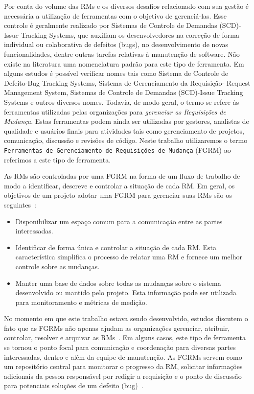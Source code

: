 Por conta do volume das RMs e os diversos desafios relacionado com sua gestão é
necessária a utilização de ferramentas com o objetivo de gerenciá-las. Esse
controle é geralmente realizado por Sistemas de Controle de Demandas (SCD)-
Issue Tracking Systems, que auxiliam os desenvolvedores na correção de forma
individual ou colaborativa de defeitos (bugs), no desenvolvimento de novas
funcionalidades, dentre outras tarefas relativas à manutenção de software. Não
existe na literatura uma nomenclatura padrão para este tipo de ferramenta. Em
alguns estudos é possível verificar nomes tais como Sistema de Controle de
Defeito\@-\@ Bug Tracking Systems, Sistema de Gerenciamento da Requisição\@-\@
Request Management System, Sistemas de Controle de Demandas (SCD)\@-\@ Issue
Tracking Systems e outros diversos nomes.  Todavia, de modo geral, o termo se
refere às ferramentas utilizadas pelas organizações para \textit{gerenciar as
    Requisições de Mudança}. Estas ferramentas podem ainda ser utilizadas por
gestores, analistas de qualidade e usuários finais para atividades tais como
gerenciamento de projetos, comunicação, discussão e revisões de código. Neste
trabalho utilizaremos o termo \texttt{Ferramentas de Gerenciamento de
    Requisições de Mudança} (FGRM) ao referimos a este tipo de ferramenta.

As RMs são controladas por uma FGRM na forma de um fluxo de trabalho de modo a
identificar, descreve e controlar a situação de cada RM\@. Em geral, os
objetivos de um projeto adotar uma FGRM para gerenciar suas RMs são os
seguintes~\cite{tripathy2014software}:

\begin{itemize}
    \item Disponibilizar um espaço comum para a comunicação entre as partes
        interessadas.
	\item Identificar de forma única e controlar a situação de cada RM\@. Esta
		característica simplifica o processo de relatar uma RM e fornece um
		melhor controle sobre as mudanças.
    \item Manter uma base de dados sobre todas as mudanças sobre o sistema
        desenvolvido ou mantido pelo projeto. Esta informação pode ser utilizada
        para monitoramento e métricas de medição.
\end{itemize}

No momento em que este trabalho estava sendo desenvolvido, estudos discutem o
fato que as FGRMs não apenas ajudam as organizações gerenciar, atribuir,
controlar, resolver e arquivar as RMs~\cite{Bertram:2010:CCB:1718918.1718972}.
Em alguns casos, este tipo de ferramenta se tornou o ponto focal para
comunicação e coordenação para diversas partes interessadas, dentro e além da
equipe de manutenção. As FGRMs servem como um repositório central para monitorar
o progresso da RM, solicitar informações adicionais da pessoa responsável por
redigir a requisição e o ponto de discussão para potenciais soluções de um
defeito (bug)~\cite{zimmermann2009improving}.

